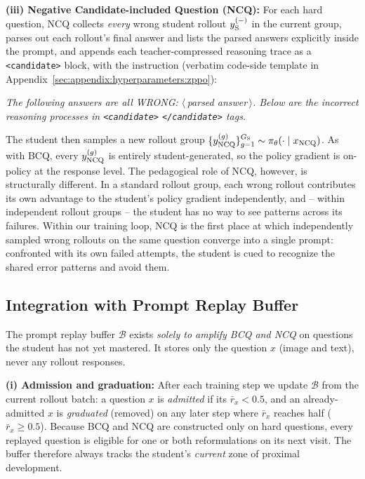 \documentclass{llmxive}
\begin{document}
\textbf{(iii) Negative Candidate-included Question (NCQ):} For each hard question, NCQ collects \emph{every} wrong student rollout $y_{\rm S}^{(-)}$ in the current group, parses out each rollout's final answer and lists the parsed answers explicitly inside the prompt, and appends each teacher-compressed reasoning trace as a \texttt{<candidate>} block, with the instruction (verbatim code-side template in Appendix~\ref{sec:appendix:hyperparameters:zppo}):
\begin{prompttemplate}
\footnotesize
\emph{The following answers are all WRONG: $\langle$\,parsed answer\,$\rangle$. Below are the incorrect reasoning processes in \texttt{<candidate>} \texttt{</candidate>} tags.}
\end{prompttemplate}
The student then samples a new rollout group $\{y_{\rm NCQ}^{(g)}\}_{g=1}^{G_{\rm S}} \sim \pi_\theta(\cdot \mid x_{\rm NCQ})$. As with BCQ, every $y_{\rm NCQ}^{(g)}$ is entirely student-generated, so the policy gradient is on-policy at the response level. The pedagogical role of NCQ, however, is structurally different. In a standard rollout group, each wrong rollout contributes its own advantage to the student's policy gradient independently, and -- within independent rollout groups -- the student has no way to see patterns across its failures. Within our training loop, NCQ is the first place at which independently sampled wrong rollouts on the same question converge into a single prompt: confronted with its own failed attempts, the student is cued to recognize the shared error patterns and avoid them.


\subsection{Integration with Prompt Replay Buffer}
\label{sec:method:buffer}

The prompt replay buffer $\mathcal{B}$ exists \emph{solely to amplify BCQ and NCQ} on questions the student has not yet mastered. It stores only the question $x$ (image and text), never any rollout responses.

\textbf{(i) Admission and graduation:} After each training step we update $\mathcal{B}$ from the current rollout batch: a question $x$ is \emph{admitted} if its $\bar{r}_x\!<\!0.5$, and an already-admitted $x$ is \emph{graduated} (removed) on any later step where $\bar{r}_x$ reaches half ($\bar{r}_x\!\geq\!0.5$). Because BCQ and NCQ are constructed only on hard questions, every replayed question is eligible for one or both reformulations on its next visit. The buffer therefore always tracks the student's \emph{current} zone of proximal development.
\end{document}
